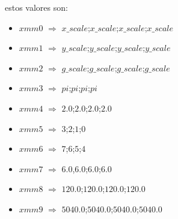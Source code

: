 estos valores son:
\begin{itemize}
	\item $xmm0$ $\Rightarrow$ $x\_scale$;$x\_scale$;$x\_scale$;$x\_scale$
	\item $xmm1$ $\Rightarrow$ $y\_scale$;$y\_scale$;$y\_scale$;$y\_scale$
	\item $xmm2$ $\Rightarrow$ $g\_scale$;$g\_scale$;$g\_scale$;$g\_scale$
	\item $xmm3$ $\Rightarrow$ $pi$;$pi$;$pi$;$pi$
	\item $xmm4$ $\Rightarrow$ $2.0$;$2.0$;$2.0$;$2.0$
	\item $xmm5$ $\Rightarrow$ $3$;$2$;$1$;$0$
	\item $xmm6$ $\Rightarrow$ $7$;$6$;$5$;$4$
	\item $xmm7$ $\Rightarrow$ $6.0$,$6.0$;$6.0$;$6.0$
	\item $xmm8$ $\Rightarrow$ $120.0$;$120.0$;$120.0$;$120.0$
	\item $xmm9$ $\Rightarrow$ $5040.0$;$5040.0$;$5040.0$;$5040.0$
\end{itemize}

